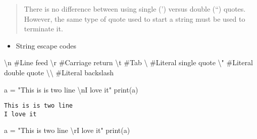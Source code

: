 \documentclass[
  letterpaper,
  DIV=11,
  numbers=noendperiod]{scrreprt}
\newenvironment{Shaded}{\begin{snugshade}}{\end{snugshade}}
\newcommand{\BuiltInTok}[1]{\textcolor[rgb]{0.00,0.46,0.62}{#1}}
\newcommand{\CharTok}[1]{\textcolor[rgb]{0.13,0.47,0.30}{#1}}
\newcommand{\CommentTok}[1]{\textcolor[rgb]{0.37,0.37,0.37}{#1}}
\newcommand{\NormalTok}[1]{\textcolor[rgb]{0.00,0.46,0.62}{#1}}
\newcommand{\OperatorTok}[1]{\textcolor[rgb]{0.37,0.37,0.37}{#1}}
\newcommand{\StringTok}[1]{\textcolor[rgb]{0.13,0.47,0.30}{#1}}
\providecommand{\tightlist}{%
  \setlength{\itemsep}{0pt}\setlength{\parskip}{0pt}}
\begin{document}
\begin{quote}
There is no difference between using single (') versus double (``)
quotes. However, the same type of quote used to start a string must be
used to terminate it.
\end{quote}

\begin{itemize}
\tightlist
\item
  String escape codes
\end{itemize}

\begin{Shaded}
\begin{Highlighting}[]
\CommentTok{\textquotesingle{}}\CharTok{\textbackslash{}n}\CommentTok{\textquotesingle{}}      \CommentTok{\#Line feed}
\CommentTok{\textquotesingle{}}\CharTok{\textbackslash{}r}\CommentTok{\textquotesingle{}}      \CommentTok{\#Carriage return}
\CommentTok{\textquotesingle{}}\CharTok{\textbackslash{}t}\CommentTok{\textquotesingle{}}      \CommentTok{\#Tab}
\CommentTok{\textquotesingle{}}\CharTok{\textbackslash{}\textquotesingle{}}\CommentTok{\textquotesingle{}}      \CommentTok{\#Literal single quote}
\CommentTok{\textquotesingle{}}\CharTok{\textbackslash{}"}\CommentTok{\textquotesingle{}}      \CommentTok{\#Literal double quote}
\CommentTok{\textquotesingle{}}\CharTok{\textbackslash{}\textbackslash{}}\CommentTok{\textquotesingle{}}      \CommentTok{\#Literal backslash}
\end{Highlighting}
\end{Shaded}

\begin{Shaded}
\begin{Highlighting}[]
\NormalTok{a  }\OperatorTok{=} \StringTok{"This is is two line }\CharTok{\textbackslash{}n}\StringTok{I love it"}
\BuiltInTok{print}\NormalTok{(a)}
\end{Highlighting}
\end{Shaded}

\begin{verbatim}
This is is two line 
I love it
\end{verbatim}

\begin{Shaded}
\begin{Highlighting}[]
\NormalTok{a  }\OperatorTok{=} \StringTok{"This is  two line }\CharTok{\textbackslash{}r}\StringTok{I love it"}
\BuiltInTok{print}\NormalTok{(a)}
\end{Highlighting}
\end{Shaded}
\end{document}
